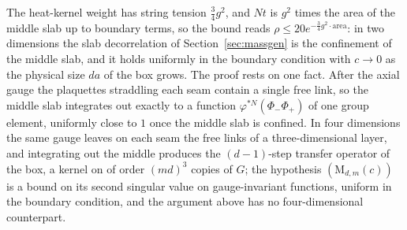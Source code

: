 The heat-kernel weight has string tension $\frac34g^2$, and $Nt$ is $g^2$ times
the area of the middle slab up to boundary terms, so the bound reads
$\rho\le20e^{-\frac34g^2\cdot\mathrm{area}}$: in two dimensions the slab
decorrelation of Section~\ref{sec:massgen} is the confinement of the middle
slab, and it holds uniformly in the boundary condition with $c\to0$ as the
physical size $da$ of the box grows. The proof rests on one fact. After the
axial gauge the plaquettes straddling each seam contain a single free link, so
the middle slab integrates out exactly to a function $\varphi^{*N}(\Phi_-\Phi_+)$
of one group element, uniformly close to $1$ once the middle slab is confined.
In four dimensions the same gauge leaves on each seam the free links of a
three-dimensional layer, and integrating out the middle produces the
$(d-1)$-step transfer operator of the box, a kernel on of order $(md)^3$ copies
of $G$; the hypothesis $(\mathrm M_{d,m}(c))$ is a bound on its second singular
value on gauge-invariant functions, uniform in the boundary condition, and the
argument above has no four-dimensional counterpart.

